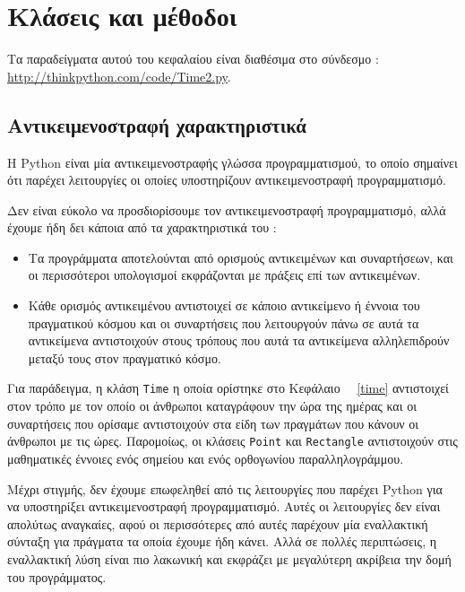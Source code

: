 \documentclass[10pt]{book}
\begin{document}
\chapter{Κλάσεις και μέθοδοι}

Τα παραδείγματα αυτού του κεφαλαίου είναι διαθέσιμα στο σύνδεσμο : 
\url{http://thinkpython.com/code/Time2.py}. 

\section{Αντικειμενοστραφή χαρακτηριστικά}

Η  Python  είναι μία αντικειμενοστραφής γλώσσα προγραμματισμού, το οποίο σημαίνει ότι παρέχει λειτουργίες οι οποίες υποστηρίζουν αντικειμενοστραφή προγραμματισμό. 

Δεν είναι εύκολο να προσδιορίσουμε τον αντικειμενοστραφή προγραμματισμό, αλλά έχουμε ήδη δει κάποια από τα χαρακτηριστικά του : 


\begin{itemize}

\item Τα προγράμματα αποτελούνται από ορισμούς αντικειμένων και συναρτήσεων, και οι περισσότεροι υπολογισμοί εκφράζονται με πράξεις επί των αντικειμένων.

\item Κάθε ορισμός αντικειμένου αντιστοιχεί σε κάποιο αντικείμενο ή έννοια του πραγματικού 
κόσμου και οι συναρτήσεις που λειτουργούν πάνω σε αυτά τα αντικείμενα αντιστοιχούν στους τρόπους που αυτά τα αντικείμενα αλληλεπιδρούν μεταξύ τους στον πραγματικό κόσμο.

\end{itemize}

Για παράδειγμα, η κλάση  {\tt Time}  η οποία ορίστηκε στο Κεφάλαιο~ ~\ref{time}  αντιστοιχεί στον τρόπο με τον 
οποίο οι άνθρωποι καταγράφουν την ώρα της ημέρας και οι συναρτήσεις που ορίσαμε αντιστοιχούν στα είδη των πραγμάτων που κάνουν 
οι άνθρωποι με τις ώρες.  Παρομοίως, οι κλάσεις  {\tt Point}  και  {\tt Rectangle}  αντιστοιχούν στις μαθηματικές έννοιες ενός σημείου και ενός ορθογωνίου παραλληλογράμμου.

Μέχρι στιγμής, δεν έχουμε επωφεληθεί από τις λειτουργίες που παρέχει  Python  για να υποστηρίξει αντικειμενοστραφή προγραμματισμό.  Αυτές οι λειτουργίες δεν είναι απολύτως αναγκαίες, αφού οι περισσότερες από αυτές παρέχουν μία εναλλακτική σύνταξη για πράγματα τα οποία έχουμε ήδη κάνει.  Αλλά σε πολλές περιπτώσεις, η εναλλακτική λύση είναι πιο λακωνική και εκφράζει με μεγαλύτερη ακρίβεια την δομή του προγράμματος.
\end{document}
